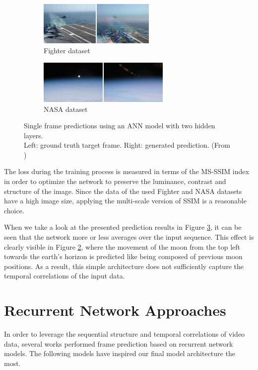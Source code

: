 \begin{figure}[htb]
\centering
\begin{subfigure}{0.5\textwidth}
  \centering
  \includegraphics[height=2.1cm]{figures/related/fighter.png}
  \caption{Fighter dataset}
  \label{fig:aan_samples_fighter}
\end{subfigure}%
\begin{subfigure}{0.5\textwidth}
  \centering
  \includegraphics[height=2.1cm]{figures/related/nasa.png}
  \caption{NASA dataset}
  \label{fig:aan_samples_nasa}
\end{subfigure}
\caption[ANN Frame Prediction]{Single frame predictions using an ANN model with two hidden layers.\\
Left: ground truth target frame. Right: generated prediction. (From \parencite{ann})}
\label{fig:aan_samples}
\end{figure}

The loss during the training process is measured in terms of the MS-SSIM index in order to optimize the network to preserve the luminance, contrast and structure of the image. Since the data of the used Fighter and NASA datasets have a high image size, applying the multi-scale version of SSIM is a reasonable choice.

When we take a look at the presented prediction results in Figure \ref{fig:aan_samples}, it can be seen that the network more or less averages over the input sequence. This effect is clearly visible in Figure \ref{fig:aan_samples_nasa}, where the movement of the moon from the top left towards the earth's horizon is predicted like being composed of previous moon positions. As a result, this simple architecture does not sufficiently capture the temporal correlations of the input data.

\section{Recurrent Network Approaches}

In order to leverage the sequential structure and temporal correlations of video data, several works performed frame prediction based on recurrent network models. The following models have inspired our final model architecture the most.

